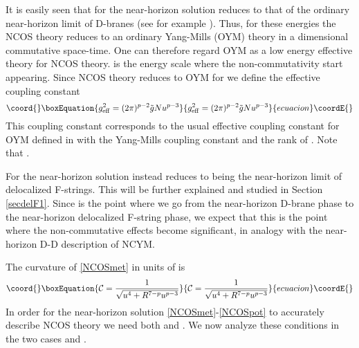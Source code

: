 \documentclass[a4paper,twoside,titlepage,12pt]{article}
\begin{document}
It is easily seen that for \coordHE{} the near-horizon solution reduces
to that of the ordinary near-horizon limit of D\coordHE{}-branes
(see for example \cite{Itzhaki:1998dd}). Thus, for these 
energies the NCOS theory reduces to an ordinary Yang-Mills (OYM) theory
in a \coordHE{} dimensional commutative space-time.
One can therefore regard OYM as a low energy effective theory for NCOS theory.
\coordHE{} is the energy scale where
the non-commutativity start appearing.
Since NCOS theory reduces to OYM for \coordHE{} 
we define the effective coupling constant
%
\begin{equation}\coord{}\boxEquation{
\geff^2 = (2\pi)^{p-2} \tilde{g} N u^{p-3} 
}{
\geff^2 = (2\pi)^{p-2} \tilde{g} N u^{p-3} 
}{ecuacion}\coordE{}\end{equation}
%
This coupling constant corresponds to the usual effective coupling 
constant for OYM defined in \cite{Itzhaki:1998dd}
with \coordHE{} the Yang-Mills coupling
constant and \coordHE{} the rank of \coordHE{}. 
Note that \coordHE{}.

For \coordHE{} the near-horizon solution instead reduces to 
being the near-horizon limit of delocalized F-strings. This
will be further explained and studied in Section \ref{secdelF1}.
Since \coordHE{} is the point where we go from the 
near-horizon D\coordHE{}-brane phase to the near-horizon delocalized F-string phase,
we expect that this is the point where the non-commutative effects
become significant, in analogy with the near-horizon D\coordHE{}-D\coordHE{} 
description of NCYM.

The curvature of \eqref{NCOSmet} in units of \coordHE{} is
%
\begin{equation}\coord{}\boxEquation{
\label{curv}
\mathcal{C} = \frac{1}{\sqrt{u^4 + R^{7-p} u^{p-3} }} 
}{
\mathcal{C} = \frac{1}{\sqrt{u^4 + R^{7-p} u^{p-3} }} 
}{ecuacion}\coordE{}\end{equation}
%
In order for the near-horizon 
solution \eqref{NCOSmet}-\eqref{NCOSpot}
to accurately describe NCOS theory we need both \coordHE{}
and \coordHE{}.
We now analyze these conditions in the two cases \coordHE{}
and \coordHE{}.
\end{document}

